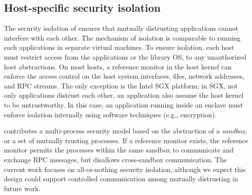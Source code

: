 \subsection{Host-specific security isolation}
\label{sec:overview:host:security}


The security isolation of \graphene{} ensures that mutually distrusting applications cannot interfere with each other. The mechanism of isolation is comparable to running each applications in separate virtual machines.
To ensure isolation, each host must restrict access from the applications or the library OS, to any unauthorized host abstractions.
On most hosts, a reference monitor in the host kernel can enforce the access control on the host system interfaces, files, network addresses, and RPC streams.
The only exception is the Intel SGX platform; in SGX, not only applications distrust each other, an application also assume the host kernel to be untrustworthy.
In this case, an application running inside an enclave must enforce isolation internally using software techniques (e.g., encryption).


\graphene{} contributes a multi-process security model 
based on the abstraction of a \emph{sandbox},
or a set of mutually trusting processes.
If a reference monitor exists, the reference monitor permits the processes within the same sandbox to communicate and exchange RPC messages, but disallows cross-sandbox communication.
The current work focuses on all-or-nothing security isolation, although we expect
this design could support
controlled communication among mutually distrusting \liboses{}
in future work.

